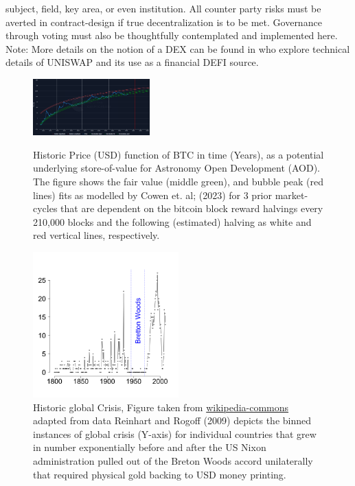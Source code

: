 \documentclass[final,5p,times,twocolumn,authoryear]{elsarticle}
\begin{document}
subject, field, key area,  or even institution. All counter party risks must be averted in contract-design if true decentralization is to be met. Governance through voting must also be thoughtfully contemplated and implemented here. Note:  More details on the notion of a DEX can be found in \cite{uniswap2019_angeris} who explore technical details of UNISWAP and its use as a financial DEFI source.

 \begin{figure}[ht!]
  \centering
  \caption{Historic Price (USD) function of BTC in time (Years), as a potential underlying store-of-value for Astronomy Open Development (AOD). The figure shows the fair value (middle green), and bubble peak (red lines) fits as modelled by Cowen et. al; (2023) for 3 prior market-cycles that are dependent on the bitcoin block reward halvings every 210,000 blocks and the following (estimated) halving as white and red vertical lines, respectively.}
  \includegraphics[width=0.4\textwidth]{figs/cowen3.png}
  \label{fig:cowen}
  \end{figure}

\begin{figure}[h!]
    \centering
  \caption{Historic global Crisis, Figure taken from \href{https://en.wikipedia.org/wiki/Global_recession}{wikipedia-commons} adapted from data Reinhart and Rogoff (2009) depicts the binned instances of global crisis (Y-axis) for individual countries that grew in number exponentially before and after the US Nixon administration pulled out of the Breton Woods accord unilaterally that required physical gold backing to USD money printing.}
  \label{fig:crisis}
  \includegraphics[width=0.5\textwidth]{figs/330px-BankingCrises.svg.png}
\end{figure}
\end{document}
